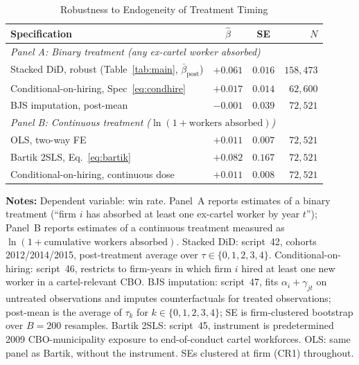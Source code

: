 \begin{table}[htbp]
\centering
\caption{Robustness to Endogeneity of Treatment Timing}\label{tab:robust_endog}
\begin{tabular}{lccr}
\toprule
Specification & $\hat\beta$ & SE & $N$ \\
\midrule
\multicolumn{4}{l}{\emph{Panel A: Binary treatment (any ex-cartel worker absorbed)}} \\[3pt]
Stacked DiD, robust (Table~\ref{tab:main}, $\bar\beta_{\text{post}}$) & $+0.061$ & $0.016$ & $158{,}473$ \\
Conditional-on-hiring, Spec~\eqref{eq:condhire} & $+0.017$ & $0.014$ & $62{,}600$ \\
BJS imputation, post-mean & $-0.001$ & $0.039$ & $72{,}521$ \\[8pt]
\multicolumn{4}{l}{\emph{Panel B: Continuous treatment ($\ln(1 + \text{workers absorbed})$)}} \\[3pt]
OLS, two-way FE & $+0.011$ & $0.007$ & $72{,}521$ \\
Bartik 2SLS, Eq.~\eqref{eq:bartik} & $+0.082$ & $0.167$ & $72{,}521$ \\
Conditional-on-hiring, continuous dose & $+0.011$ & $0.008$ & $72{,}521$ \\
\bottomrule
\end{tabular}
\vspace{0.5em}
\begin{minipage}{0.95\textwidth}
\scriptsize{\textbf{Notes:} Dependent variable: win rate. Panel~A reports estimates of a binary treatment (``firm $i$ has absorbed at least one ex-cartel worker by year $t$''); Panel~B reports estimates of a continuous treatment measured as $\ln(1 + \text{cumulative workers absorbed})$. Stacked DiD: script~42, cohorts 2012/2014/2015, post-treatment average over $\tau\in\{0,1,2,3,4\}$. Conditional-on-hiring: script~46, restricts to firm-years in which firm $i$ hired at least one new worker in a cartel-relevant CBO. BJS imputation: script~47, fits $\alpha_i+\gamma_{jt}$ on untreated observations and imputes counterfactuals for treated observations; post-mean is the average of $\tau_k$ for $k\in\{0,1,2,3,4\}$; SE is firm-clustered bootstrap over $B=200$ resamples. Bartik 2SLS: script~45, instrument is predetermined 2009 CBO-municipality exposure to end-of-conduct cartel workforces. OLS: same panel as Bartik, without the instrument. SEs clustered at firm (CR1) throughout.\par}
\end{minipage}
\end{table}


